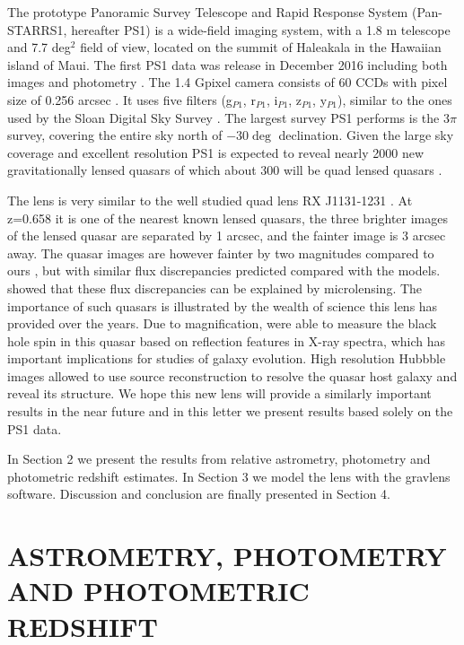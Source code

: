 \documentclass[manuscript]{aastex}
\begin{document}
The prototype Panoramic Survey Telescope and Rapid Response System (Pan-STARRS1, hereafter PS1) is a wide-field imaging system, with a 1.8 m telescope and 7.7 deg$^2$ field of view, located on the summit of Haleakala in the Hawaiian island of Maui. The first PS1 data was release in December 2016 including both images and photometry  \citep[see ][]{cha16}. The 1.4 Gpixel camera consists of 60 CCDs with pixel size of 0.256 arcsec \citep{ona08, ton09}. It uses five filters (g$_{P1}$, r$_{P1}$, i$_{P1}$, z$_{P1}$, y$_{P1}$), similar to the ones used by the Sloan Digital Sky Survey \citep[SDSS ][]{york00}. The largest survey PS1 performs is the 3$\pi$ survey, covering the entire sky north of $-30\deg$ declination. Given the large sky coverage and excellent resolution PS1 is expected to reveal nearly 2000 new gravitationally lensed quasars of which about 300 will be quad lensed quasars \citep{ogu10}.

The lens is very similar to the well studied quad lens RX J1131-1231 \citep{slu03}. At z=0.658 it is one of the nearest known lensed quasars, the three brighter images of the lensed quasar are separated by 1 arcsec, and the fainter image is 3 arcsec away. The quasar images are however fainter by two magnitudes compared to ours \citep{slu06}, but with similar flux discrepancies predicted compared with the models. \citet{slu08} showed that these flux discrepancies can be explained by microlensing. The importance of such quasars is illustrated by the wealth of science this lens has provided over the years.  Due to magnification, \citet{reis14} were able to measure the black hole spin in this quasar based on reflection features in X-ray spectra, which has important implications for studies of galaxy evolution. High resolution Hubbble images allowed \citet{bre08} to use source reconstruction to resolve the quasar host galaxy and reveal its structure. We hope this new lens will provide a similarly important results in the near future and in this letter we present results based solely on the PS1 data.  

In Section 2 we present the results from relative astrometry, photometry and photometric redshift estimates. In Section 3 we model the lens with the gravlens software. Discussion and conclusion are finally presented in Section 4.



\section{ASTROMETRY, PHOTOMETRY AND PHOTOMETRIC REDSHIFT}
\end{document}
